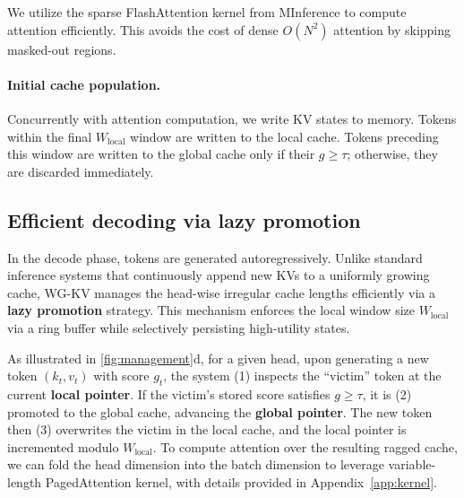 We utilize the sparse FlashAttention kernel from MInference \cite{minference} to compute attention efficiently. This avoids the cost of dense $O(N^2)$ attention by skipping masked-out regions.

\paragraph{Initial cache population.} Concurrently with attention computation, we write KV states to memory. Tokens within the final $W_{\text{local}}$ window are written to the local cache. Tokens preceding this window are written to the global cache only if their $g \ge \tau$; otherwise, they are discarded immediately.

\subsection{Efficient decoding via lazy promotion}

In the decode phase, tokens are generated autoregressively. Unlike standard inference systems \cite{pagedattn,sglang} that continuously append new KVs to a uniformly growing cache, WG-KV manages the head-wise irregular cache lengths efficiently via a \textbf{lazy promotion} strategy. This mechanism enforces the local window size $W_{\text{local}}$ via a ring buffer while selectively persisting high-utility states.

As illustrated in \cref{fig:management}d, for a given head, upon generating a new token $(k_t, v_t)$ with score $g_t$, the system (1) inspects the ``victim'' token at the current \textbf{local pointer}. If the victim's stored score satisfies $g \ge \tau$, it is (2) promoted to the global cache, advancing the \textbf{global pointer}. The new token then (3) overwrites the victim in the local cache, and the local pointer is incremented modulo $W_{\text{local}}$. To compute attention over the resulting ragged cache, we can fold the head dimension into the batch dimension to leverage variable-length PagedAttention \cite{pagedattn} kernel, with details provided in Appendix~\ref{app:kernel}.